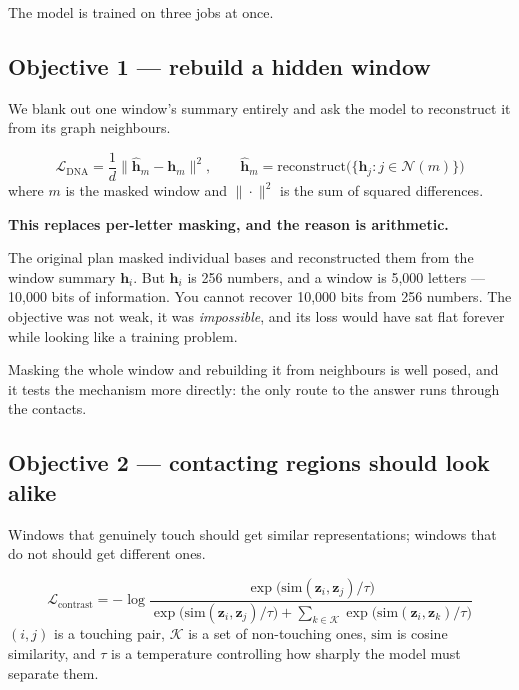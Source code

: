 \documentclass[11pt,a4paper]{article}
\newcommand{\hvec}[1]{\mathbf{h}_{#1}}
\newcommand{\zvec}[1]{\mathbf{z}_{#1}}
\begin{document}
The model is trained on three jobs at once.

\subsection{Objective 1 --- rebuild a hidden window}

We blank out one window's summary entirely and ask the model to reconstruct it
from its graph neighbours.

\begin{mathbox}
\begin{equation}
\mathcal{L}_{\mathrm{DNA}}
= \frac{1}{d}\big\| \hat{\mathbf{h}}_{m} - \hvec{m} \big\|^2 ,
\qquad
\hat{\mathbf{h}}_{m} = \text{reconstruct}\big(\{\hvec{j} : j \in \mathcal{N}(m)\}\big)
\end{equation}
where $m$ is the masked window and $\|\cdot\|^2$ is the sum of squared
differences.
\end{mathbox}

\begin{carefulbox}
\textbf{This replaces per-letter masking, and the reason is arithmetic.}

The original plan masked individual bases and reconstructed them from the window
summary $\hvec{i}$. But $\hvec{i}$ is 256 numbers, and a window is 5{,}000 letters
--- 10{,}000 bits of information. You cannot recover 10{,}000 bits from 256
numbers. The objective was not weak, it was \emph{impossible}, and its loss would
have sat flat forever while looking like a training problem.

Masking the whole window and rebuilding it from neighbours is well posed, and it
tests the mechanism more directly: the only route to the answer runs through the
contacts.
\end{carefulbox}

\subsection{Objective 2 --- contacting regions should look alike}

Windows that genuinely touch should get similar representations; windows that do
not should get different ones.

\begin{mathbox}
\begin{equation}
\mathcal{L}_{\mathrm{contrast}}
= -\log
\frac{\exp\!\big(\mathrm{sim}(\zvec{i}, \zvec{j})/\tau\big)}
     {\exp\!\big(\mathrm{sim}(\zvec{i}, \zvec{j})/\tau\big)
      + \sum_{k \in \mathcal{K}} \exp\!\big(\mathrm{sim}(\zvec{i}, \zvec{k})/\tau\big)}
\end{equation}
$(i,j)$ is a touching pair, $\mathcal{K}$ is a set of non-touching ones,
$\mathrm{sim}$ is cosine similarity, and $\tau$ is a temperature controlling how
sharply the model must separate them.
\end{mathbox}
\end{document}
